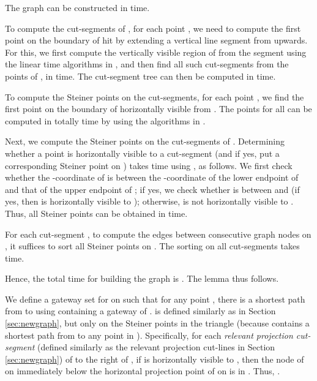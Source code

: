 \documentclass[english,runningheads,11pt]{llncs}
\newenvironment{proof}{\noindent {\textbf{Proof:}}\rm}{\hfill \rm}
\begin{document}
\begin{lemma}\label{lem:120}
The graph  can be constructed in
 time.
\end{lemma}
\begin{proof}
To compute the cut-segments of , for each point , we need to
compute the first point on the boundary of  hit by extending a
vertical line segment from  upwards.
For this, we first compute the vertically visible region of  from the segment 
using the linear time algorithms in \cite{ref:JoeCo87,ref:LeeVi83}, and then
find all such cut-segments from the points of , in  time.
The cut-segment tree  can then be computed in
 time.

To compute the Steiner points on the cut-segments, for each point
, we find the first point  on the boundary of 
horizontally visible from .
The points  for all  can be computed in totally
 time by using the algorithms in \cite{ref:JoeCo87,ref:LeeVi83}.

Next, we compute the Steiner points on the cut-segments of .
Determining whether a point  is
horizontally visible to a cut-segment  (and if yes, put a
corresponding Steiner point on ) takes  time using
, as follows. We first check whether the -coordinate of  is between the
-coordinate of the lower endpoint of  and that of the upper
endpoint of ; if yes, we check whether  is between  and
 (if yes, then  is horizontally visible to );
otherwise,  is not horizontally visible to .
Thus, all Steiner
points can be obtained in  time.

For each cut-segment , to compute the edges between consecutive graph nodes
on , it suffices to sort all Steiner points on
. The sorting on all cut-segments takes  time.

Hence, the total time for building the graph  is .
The lemma thus follows.
\end{proof}



We define a gateway set  for  on  such that
for any point ,
there is a shortest path from  to
 using  containing a gateway of .
 is defined similarly as  in Section \ref{sec:newgraph},
but only on the Steiner points in the triangle 
(because  contains a shortest path
from  to any point in ). Specifically, for each
{\em relevant projection cut-segment}   (defined similarly as the
relevant projection cut-lines in Section \ref{sec:newgraph})
of  to the right of , if  is horizontally visible
to , then the node of  on  immediately below the horizontal projection
point of  on  is in . Thus,
.
\end{document}
